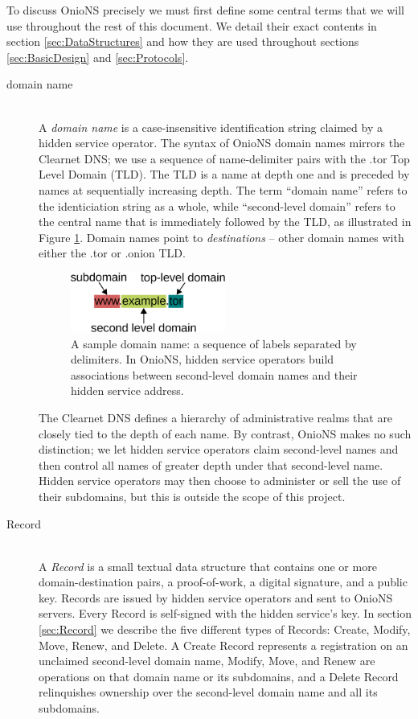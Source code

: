 To discuss OnioNS precisely we must first define some central terms that we will use throughout the rest of this document. We detail their exact contents in section \ref{sec:DataStructures} and how they are used throughout sections \ref{sec:BasicDesign} and \ref{sec:Protocols}.

\begin{description}
	\item[domain name] \hfill \\
		A \emph{domain name} is a case-insensitive identification string claimed by a hidden service operator. The syntax of OnioNS domain names mirrors the Clearnet DNS; we use a sequence of name-delimiter pairs with the .tor Top Level Domain (TLD). The TLD is a name at depth one and is preceded by names at sequentially increasing depth. The term ``domain name'' refers to the identiciation string as a whole, while ``second-level domain'' refers to the central name that is immediately followed by the TLD, as illustrated in Figure \ref{fig:sampleDomain}. Domain names point to \emph{destinations} -- other domain names with either the .tor or .onion TLD.
		
		\begin{figure}[htbp]
			\centering
			\includegraphics[width=0.5\textwidth]{images/domain-name.eps}
			\caption{A sample domain name: a sequence of labels separated by delimiters. In OnioNS, hidden service operators build associations between second-level domain names and their hidden service address.}
			\label{fig:sampleDomain}
		\end{figure}
		
	The Clearnet DNS defines a hierarchy of administrative realms that are closely tied to the depth of each name. By contrast, OnioNS makes no such distinction; we let hidden service operators claim second-level names and then control all names of greater depth under that second-level name. Hidden service operators may then choose to administer or sell the use of their subdomains, but this is outside the scope of this project.

	\item[Record] \hfill \\
		A \emph{Record} is a small textual data structure that contains one or more domain-destination pairs, a proof-of-work, a digital signature, and a public key. Records are issued by hidden service operators and sent to OnioNS servers. Every Record is self-signed with the hidden service's key. In section \ref{sec:Record} we describe the five different types of Records: Create, Modify, Move, Renew, and Delete. A Create Record represents a registration on an unclaimed second-level domain name, Modify, Move, and Renew are operations on that domain name or its subdomains, and a Delete Record relinquishes ownership over the second-level domain name and all its subdomains.
		

\end{description}

